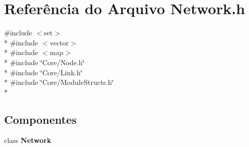 \section{Referência do Arquivo Network.\+h}
\label{_network_8h}
{\ttfamily \#include $<$set$>$}\\*
{\ttfamily \#include $<$vector$>$}\\*
{\ttfamily \#include $<$map$>$}\\*
{\ttfamily \#include \char`\"{}Core/\+Node.\+h\char`\"{}}\\*
{\ttfamily \#include \char`\"{}Core/\+Link.\+h\char`\"{}}\\*
{\ttfamily \#include \char`\"{}Core/\+Module\+Structs.\+h\char`\"{}}\\*
\subsection*{Componentes}
\begin{DoxyCompactItemize}
\item 
class {\bf Network}
\end{DoxyCompactItemize}
